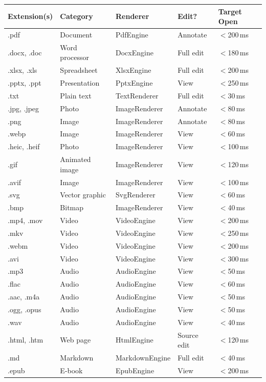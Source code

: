 \documentclass[11pt, a4paper, openright]{report}
\begin{document}
\begin{longtable}{@{}p{18mm}p{38mm}p{32mm}p{22mm}p{28mm}@{}}
\toprule
\textbf{Extension(s)} & \textbf{Category} & \textbf{Renderer} & \textbf{Edit?} & \textbf{Target Open} \\
\midrule
.pdf & Document & PdfEngine & Annotate & $<$200\,ms \\
.docx, .doc & Word processor & DocxEngine & Full edit & $<$180\,ms \\
.xlsx, .xls & Spreadsheet & XlsxEngine & Full edit & $<$200\,ms \\
.pptx, .ppt & Presentation & PptxEngine & View & $<$250\,ms \\
.txt & Plain text & TextRenderer & Full edit & $<$30\,ms \\
.jpg, .jpeg & Photo & ImageRenderer & Annotate & $<$80\,ms \\
.png & Image & ImageRenderer & Annotate & $<$80\,ms \\
.webp & Image & ImageRenderer & View & $<$60\,ms \\
.heic, .heif & Photo & ImageRenderer & View & $<$100\,ms \\
.gif & Animated image & ImageRenderer & View & $<$120\,ms \\
.avif & Image & ImageRenderer & View & $<$100\,ms \\
.svg & Vector graphic & SvgRenderer & View & $<$60\,ms \\
.bmp & Bitmap & ImageRenderer & View & $<$40\,ms \\
.mp4, .mov & Video & VideoEngine & View & $<$200\,ms \\
.mkv & Video & VideoEngine & View & $<$250\,ms \\
.webm & Video & VideoEngine & View & $<$200\,ms \\
.avi & Video & VideoEngine & View & $<$300\,ms \\
.mp3 & Audio & AudioEngine & View & $<$50\,ms \\
.flac & Audio & AudioEngine & View & $<$60\,ms \\
.aac, .m4a & Audio & AudioEngine & View & $<$50\,ms \\
.ogg, .opus & Audio & AudioEngine & View & $<$50\,ms \\
.wav & Audio & AudioEngine & View & $<$40\,ms \\
.html, .htm & Web page & HtmlEngine & Source edit & $<$120\,ms \\
.md & Markdown & MarkdownEngine & Full edit & $<$40\,ms \\
.epub & E-book & EpubEngine & View & $<$200\,ms \\

\end{longtable}
\end{document}
